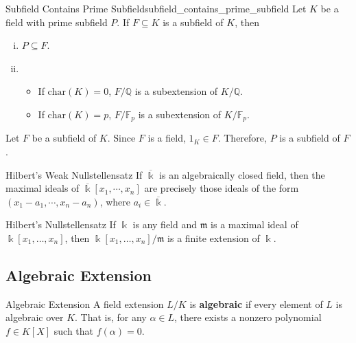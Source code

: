 \begin{proposition}{Subfield Contains Prime Subfield}{subfield_contains_prime_subfield}
    Let $K$ be a field with prime subfield $P$. If $F\subseteq K$ is a subfield of $K$, then
    \begin{enumerate}[(i)]
    \item $P\subseteq F$.
    \item \begin{itemize}[wide]
        \item If $\mathrm{char}(K)=0$, $F/\mathbb{Q}$ is a subextension of $K/\mathbb{Q}$.
        \item If $\mathrm{char}(K)=p$, $F/\mathbb{F}_p$ is a subextension of $K/\mathbb{F}_p$.
    \end{itemize}
    \end{enumerate}
\end{proposition}
\begin{prf}
    Let $F$ be a subfield of $K$. Since $F$ is a field, $1_K\in F$. Therefore, $P$ is a subfield of $F$.
\end{prf}



\begin{theorem}{Hilbert's Weak Nullstellensatz}{}
    If $\overline{\Bbbk}$ is an algebraically closed field, then the maximal ideals of $\overline{\Bbbk}\left[x_1, \cdots, x_n\right]$ are precisely those ideals of the form $\left(x_1-a_1, \cdots, x_n-a_{n}\right)$, where $a_i\in \overline{\Bbbk}$. 
\end{theorem}


\begin{theorem}{Hilbert's Nullstellensatz}{}
    If $\Bbbk$ is any field and $\mathfrak{m}$ is a maximal ideal of $\Bbbk\left[x_1, \ldots, x_n\right]$, then $\Bbbk\left[x_1, \ldots, x_n\right]/\mathfrak{m}$ is a finite extension of $\Bbbk$.
\end{theorem}








\subsection{Algebraic Extension}

\begin{definition}{Algebraic Extension}{}
    A field extension $L/K$ is \textbf{algebraic} if every element of $L$ is algebraic over $K$. That is, for any $\alpha\in L$, there exists a nonzero polynomial $f\in K[X]$ such that $f(\alpha)=0$.
\end{definition}



